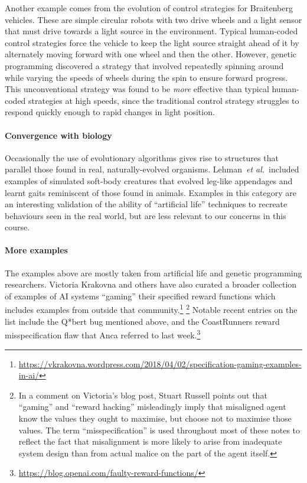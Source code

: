 \documentclass[11pt]{article}
\newcommand{\etal}{{\em et al.}\ }
\begin{document}
Another example comes from the evolution of control strategies for Braitenberg
vehicles.
%
These are simple circular robots with two drive wheels and a light sensor that
must drive towards a light source in the environment.
%
Typical human-coded control strategies force the vehicle to keep the light
source straight ahead of it by alternately moving forward with one wheel and
then the other.
%
However, genetic programming discovered a strategy that involved repeatedly
spinning around while varying the speeds of wheels during the spin to ensure
forward progress.
%
This unconventional strategy was found to be \textit{more} effective than
typical human-coded strategies at high speeds, since the traditional control
strategy struggles to respond quickly enough to rapid changes in light position.

\paragraph{Convergence with biology}
%
Occasionally the use of evolutionary algorithms gives rise to structures that
parallel those found in real, naturally-evolved organisms.
%
Lehman~\etal included examples of simulated soft-body creatures that evolved
leg-like appendages and learnt gaits reminiscent of those found in animals.
%
Examples in this category are an interesting validation of the ability of
``artificial life'' techniques to recreate behaviours seen in the real world,
but are less relevant to our concerns in this course.

\paragraph{More examples}
%
The examples above are mostly taken from artificial life and genetic programming
researchers.
%
Victoria Krakovna and others have also curated a broader collection of examples
of AI systems ``gaming'' their specified reward functions which includes
examples from outside that
community.\footnote{
  \url{https://vkrakovna.wordpress.com/2018/04/02/specification-gaming-examples-in-ai/}
}%
\footnote{
  In a comment on Victoria's blog post, Stuart Russell points out that
  ``gaming'' and ``reward hacking'' misleadingly imply that misaligned agent
  know the values they ought to maximise, but choose not to maximise those values.
  The term ``misspecification'' is used throughout most of these notes to
  reflect the fact that misalignment is more likely to arise from inadequate
  system design than from actual malice on the part of the agent itself.
}
%
Notable recent entries on the list include the Q*bert bug mentioned above, and
the CoastRunners reward misspecification flaw that Anca referred to last
week.\footnote{\url{https://blog.openai.com/faulty-reward-functions/}}
\end{document}

